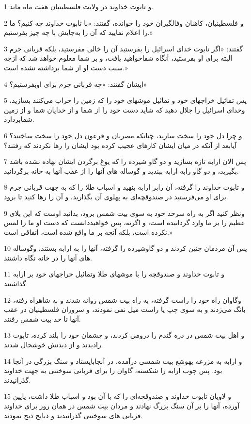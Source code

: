\par 1 و تابوت خداوند در ولایت فلسطینیان هفت ماه ماند.
\par 2 و فلسطینیان، کاهنان وفالگیران خود را خوانده، گفتند: «با تابوت خداوند چه کنیم؟ ما را اعلام نمایید که آن را به‌جایش با چه چیز بفرستیم.»
\par 3 گفتند: «اگر تابوت خدای اسرائیل را بفرستید آن را خالی مفرستید، بلکه قربانی جرم البته برای او بفرستید، آنگاه شفاخواهید یافت، و بر شما معلوم خواهد شد که ازچه سبب دست او از شما برداشته نشده است.»
\par 4 ایشان گفتند: «چه قربانی جرم برای اوبفرستیم؟»
\par 5 پس تماثیل خراجهای خود و تماثیل موشهای خود را که زمین را خراب می‌کنند بسازید، وخدای اسرائیل را جلال دهید که شاید دست خود را از شما و از خدایان شما و از زمین شمابردارد.
\par 6 و چرا دل خود را سخت سازید، چنانکه مصریان و فرعون دل خود را سخت ساختند؟ آیابعد از آنکه در میان ایشان کارهای عجیب کرده بود ایشان را رها نکردند که رفتند؟
\par 7 پس الان ارابه تازه بسازید و دو گاو شیرده را که یوغ برگردن ایشان نهاده نشده باشد بگیرید، و دو گاو رابه ارابه ببندید و گوساله های آنها را از عقب آنها به خانه برگردانید.
\par 8 و تابوت خداوند را گرفته، آن رابر ارابه بنهید و اسباب طلا را که به جهت قربانی جرم برای او می‌فرستید در صندوقچه‌ای به پهلوی آن بگذارید، و آن را رها کنید تا برود.
\par 9 ونظر کنید اگر به راه سرحد خود به سوی بیت شمس برود، بدانید اوست که این بلای عظیم را بر ما وارد گردانیده است، و اگرنه، پس خواهیددانست که دست او ما را لمس نکرده است، بلکه آنچه بر ما واقع شده است، اتفاقی است.»
\par 10 پس آن مردمان چنین کردند و دو گاوشیرده را گرفته، آنها را به ارابه بستند، وگوساله های آنها را در خانه نگاه داشتند.
\par 11 و تابوت خداوند و صندوقچه را با موشهای طلا وتماثیل خراجهای خود بر ارابه گذاشتند.
\par 12 وگاوان راه خود را راست گرفته، به راه بیت شمس روانه شدند و به شاهراه رفته، بانگ می‌زدند و به سوی چپ یا راست میل نمی نمودند، و سروران فلسطینیان در عقب آنها تا حد بیت شمس رفتند.
\par 13 و اهل بیت شمس در دره گندم را درومی کردند، و چشمان خود را بلند کرده، تابوت رادیدند و از دیدنش خوشحال شدند.
\par 14 و ارابه به مزرعه یهوشع بیت شمسی درآمده، در آنجابایستاد و سنگ بزرگی در آنجا بود. پس چوب ارابه را شکسته، گاوان را برای قربانی سوختنی به جهت خداوند گذرانیدند.
\par 15 و لاویان تابوت خداوند و صندوقچه‌ای را که با آن بود و اسباب طلا داشت، پایین آورده، آنها را بر آن سنگ بزرگ نهادند و مردان بیت شمس در همان روز برای خداوند قربانی های سوختنی گذرانیدند و ذبایح ذبح نمودند.
